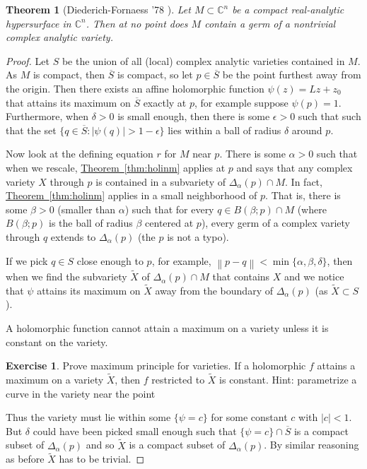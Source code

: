\documentclass[12pt,openany]{book}
\newcommand{\abs}[1]{\left\lvert {#1} \right\rvert}
\newcommand{\norm}[1]{\left\lVert {#1} \right\rVert}
\newcommand{\C}{{\mathbb{C}}}
\theoremstyle{plain}
\newtheorem{thm}{Theorem}[section]
\theoremstyle{remark}
\theoremstyle{definition}
\theoremstyle{exercise}
\newtheorem{exercise}{Exercise}[section]
\theoremstyle{example}
\newcommand{\thmref}[1]{\hyperref[#1]{Theorem~\ref*{#1}}}
\begin{document}
\begin{thm}[Diederich-Fornaess '78 \cite{DF}] \label{df:thm}
Let $M \subset \C^n$ be a compact real-analytic hypersurface in $\C^n$.
Then at no point does $M$ contain a germ of a nontrivial complex analytic
variety.
\end{thm}

\begin{proof}
Let $S$ be the union of all (local) complex analytic varieties contained in $M$.
As $M$ is compact, then $\overline{S}$ is compact, so let $p \in
\overline{S}$ be the point furthest away from the origin.  Then there exists
an affine holomorphic function $\psi(z)=Lz+z_0$ that attains its 
maximum on $\overline{S}$ exactly at $p$, for example suppose $\psi(p) = 1$.
Furthermore, when $\delta > 0$ is small enough,
then there is some $\epsilon > 0$ such that
such that the set
$\{ q \in \overline{S} : \abs{\psi(q)} > 1-\epsilon \}$ lies
within a ball of radius $\delta$ around $p$.

Now look at the defining equation $r$ for $M$ near $p$.  There is some
$\alpha > 0$ such that when we rescale,
\thmref{thm:holinm} applies at $p$ and says that any complex variety
$X$ through $p$ is contained in a subvariety of
$\Delta_{\alpha}(p) \cap M$.  In fact,
\thmref{thm:holinm} applies in a small neighborhood of $p$.
That is, there is some $\beta > 0$ (smaller than $\alpha$) such that
for every
$q \in B(\beta;p) \cap M$
(where $B(\beta;p)$ is the
ball of radius $\beta$ centered at $p$),
every germ of a complex variety through $q$ extends to
$\Delta_{\alpha}(p)$ (the $p$ is not a typo).

If we pick $q \in S$ close enough to $p$, for example,
$\norm{p-q} < \min\{ \alpha , \beta, \delta \}$, then when we find the
subvariety $\tilde{X}$ of $\Delta_\alpha(p) \cap M$ that contains $X$
and
we notice that $\psi$ attains its maximum on $\tilde{X}$ away from the boundary
of $\Delta_\alpha(p)$ (as $\tilde{X} \subset S$).

A holomorphic function cannot attain a maximum on a variety
unless it is constant on the variety.

\begin{exercise}
Prove maximum principle for varieties.  If a holomorphic $f$ attains
a maximum on a variety $\tilde{X}$, then $f$ restricted to $\tilde{X}$ is constant.
Hint: parametrize a curve
in the variety near the point
\end{exercise}

Thus the variety must lie within some
$\{ \psi = c \}$ for some constant $c$ with $\abs{c} < 1$.
But $\delta$ could have been picked small enough
such that $\{ \psi = c \} \cap \overline{S}$ is a compact subset
of $\Delta_\alpha(p)$ and so $\tilde{X}$ is a compact subset of $\Delta_\alpha(p)$.
By similar reasoning as before $\tilde{X}$ has to be trivial.
\end{proof}
\end{document}
